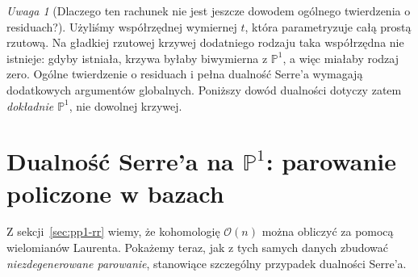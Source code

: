 \documentclass[11pt,a4paper,openany]{report}
\numberwithin{equation}{section}
\theoremstyle{plain}
\theoremstyle{definition}
\theoremstyle{remark}
\newtheorem{uwaga}[twierdzenie]{Uwaga}
\newcommand{\PP}{\mathbb P}
\begin{document}
\begin{uwaga}[Dlaczego ten rachunek nie jest jeszcze dowodem
ogólnego twierdzenia o residuach?]
Użyliśmy współrzędnej wymiernej $t$, która parametryzuje
całą prostą rzutową. Na gładkiej rzutowej krzywej dodatniego rodzaju taka
współrzędna nie istnieje: gdyby istniała, krzywa
byłaby biwymierna z $\PP^1$, a więc miałaby rodzaj zero. Ogólne twierdzenie o residuach i
pełna dualność Serre'a wymagają dodatkowych argumentów globalnych.
Poniższy dowód dualności dotyczy zatem \emph{dokładnie $\PP^1$},
nie dowolnej krzywej.
\end{uwaga}

\section[Dualność Serre'a na prostej rzutowej]{Dualność Serre'a na $\PP^1$: parowanie policzone w bazach}
\label{sec:serre-p1}

Z sekcji~\ref{sec:pp1-rr} wiemy, że kohomologię
$\mathcal O(n)$ można obliczyć za pomocą wielomianów Laurenta.
Pokażemy teraz, jak z tych samych danych zbudować
\emph{niezdegenerowane parowanie}, stanowiące szczególny
przypadek dualności Serre'a.
\end{document}
